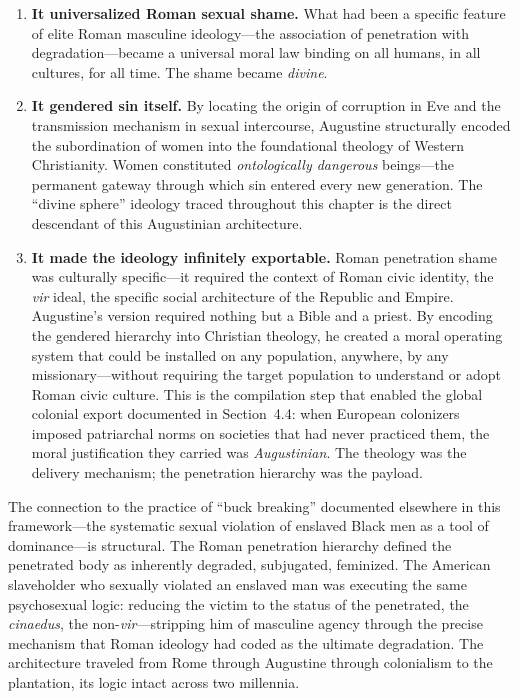 \begin{enumerate}
    \item \textbf{It universalized Roman sexual shame.} What had been a specific feature of elite Roman masculine ideology---the association of penetration with degradation---became a universal moral law binding on all humans, in all cultures, for all time. The shame became \textit{divine}.

    \item \textbf{It gendered sin itself.} By locating the origin of corruption in Eve and the transmission mechanism in sexual intercourse, Augustine structurally encoded the subordination of women into the foundational theology of Western Christianity. Women constituted \textit{ontologically dangerous} beings---the permanent gateway through which sin entered every new generation. The ``divine sphere'' ideology traced throughout this chapter is the direct descendant of this Augustinian architecture.

    \item \textbf{It made the ideology infinitely exportable.} Roman penetration shame was culturally specific---it required the context of Roman civic identity, the \textit{vir} ideal, the specific social architecture of the Republic and Empire. Augustine's version required nothing but a Bible and a priest. By encoding the gendered hierarchy into Christian theology, he created a moral operating system that could be installed on any population, anywhere, by any missionary---without requiring the target population to understand or adopt Roman civic culture. This is the compilation step that enabled the global colonial export documented in Section~4.4: when European colonizers imposed patriarchal norms on societies that had never practiced them, the moral justification they carried was \textit{Augustinian}. The theology was the delivery mechanism; the penetration hierarchy was the payload.
\end{enumerate}

The connection to the practice of ``buck breaking'' documented elsewhere in this framework---the systematic sexual violation of enslaved Black men as a tool of dominance---is structural. The Roman penetration hierarchy defined the penetrated body as inherently degraded, subjugated, feminized. The American slaveholder who sexually violated an enslaved man was executing the same psychosexual logic: reducing the victim to the status of the penetrated, the \textit{cinaedus}, the non-\textit{vir}---stripping him of masculine agency through the precise mechanism that Roman ideology had coded as the ultimate degradation. The architecture traveled from Rome through Augustine through colonialism to the plantation, its logic intact across two millennia.

